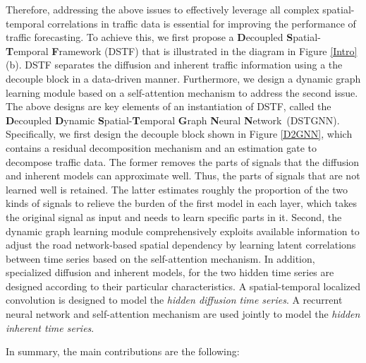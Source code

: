 \documentclass[sigconf, nonacm]{acmart}
\begin{document}
{Therefore, addressing the above issues to effectively leverage all complex spatial-temporal correlations in traffic data is essential for improving the performance of traffic forecasting. 
To achieve this, we first propose a \textbf{D}ecoupled \textbf{S}patial-\textbf{T}emporal \textbf{F}ramework (DSTF) that is illustrated in the diagram in Figure \ref{Intro}(b).
DSTF separates the diffusion and inherent traffic information using a the decouple block in a data-driven manner.
Furthermore, we design a dynamic graph learning module based on a self-attention mechanism to address the second issue.
The above designs are key elements of an instantiation of DSTF, called the \textbf{D}ecoupled \textbf{D}ynamic \textbf{S}patial-\textbf{T}emporal \textbf{G}raph \textbf{N}eural \textbf{N}etwork~(DSTGNN).
Specifically, we first design the decouple block shown in Figure \ref{D2GNN}, which contains a residual decomposition mechanism and an estimation gate to decompose traffic data. 
The former removes the parts of signals that the diffusion and inherent models can approximate well. Thus, the parts of signals that are not learned well is retained. 
The latter estimates roughly the proportion of the two kinds of signals to relieve the burden of the first model in each layer, which takes the original signal as input and needs to learn specific parts in it.
Second, the dynamic graph learning module comprehensively exploits available information to adjust the road network-based spatial dependency by learning latent correlations between time series based on the self-attention mechanism.
In addition, specialized diffusion and inherent models, for the two hidden time series are designed according to their particular characteristics.
A spatial-temporal localized convolution is designed to model the \textit{hidden diffusion time series}.
A recurrent neural network and self-attention mechanism are used jointly to model the \textit{hidden inherent time series}.}

In summary, the main contributions are the following:
\end{document}
